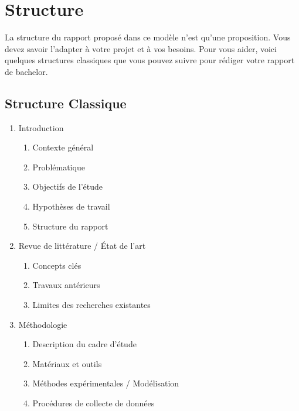 \chapter{Structure}

La structure du rapport proposé dans ce modèle n'est qu'une proposition. Vous devez savoir l'adapter à votre projet et à vos besoins. Pour vous aider, voici quelques structures classiques que vous pouvez suivre pour rédiger votre rapport de bachelor.

\section{Structure Classique}

\begin{enumerate}[label=\arabic*.]
    \item Introduction
          \begin{enumerate}[label=\arabic{enumi}.\arabic*]
              \item Contexte général
              \item Problématique
              \item Objectifs de l'étude
              \item Hypothèses de travail
              \item Structure du rapport
          \end{enumerate}

    \item Revue de littérature / État de l'art
          \begin{enumerate}[label=\arabic{enumi}.\arabic*]
              \item Concepts clés
              \item Travaux antérieurs
              \item Limites des recherches existantes
          \end{enumerate}

    \item Méthodologie
          \begin{enumerate}[label=\arabic{enumi}.\arabic*]
              \item Description du cadre d'étude
              \item Matériaux et outils
              \item Méthodes expérimentales / Modélisation
              \item Procédures de collecte de données
          \end{enumerate}


\end{enumerate}
